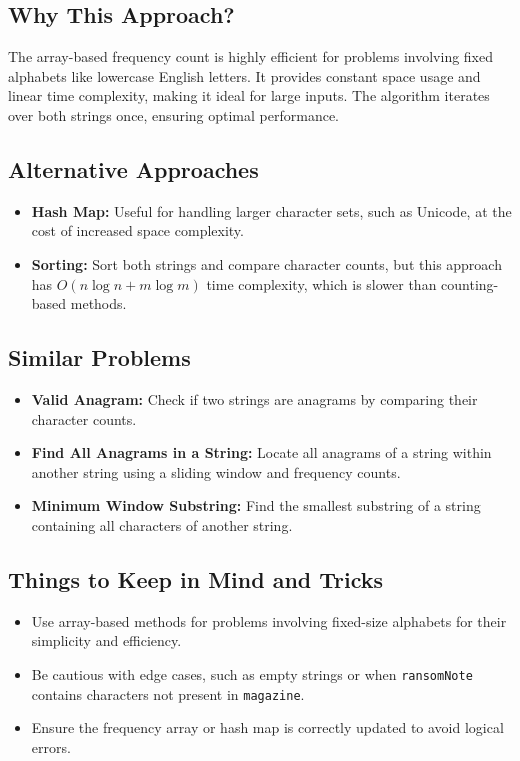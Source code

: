 \subsection*{Why This Approach?}
The array-based frequency count is highly efficient for problems involving fixed alphabets like lowercase English letters. It provides constant space usage and linear time complexity, making it ideal for large inputs. The algorithm iterates over both strings once, ensuring optimal performance.

\subsection*{Alternative Approaches}
\begin{itemize}
    \item \textbf{Hash Map:} Useful for handling larger character sets, such as Unicode, at the cost of increased space complexity.
    \item \textbf{Sorting:} Sort both strings and compare character counts, but this approach has \(O(n \log n + m \log m)\) time complexity, which is slower than counting-based methods.
\end{itemize}

\subsection*{Similar Problems}
\begin{itemize}
    \item \textbf{Valid Anagram:} Check if two strings are anagrams by comparing their character counts.
    \item \textbf{Find All Anagrams in a String:} Locate all anagrams of a string within another string using a sliding window and frequency counts.
    \item \textbf{Minimum Window Substring:} Find the smallest substring of a string containing all characters of another string.
\end{itemize}

\subsection*{Things to Keep in Mind and Tricks}
\begin{itemize}
    \item Use array-based methods for problems involving fixed-size alphabets for their simplicity and efficiency.
    \item Be cautious with edge cases, such as empty strings or when \texttt{ransomNote} contains characters not present in \texttt{magazine}.
    \item Ensure the frequency array or hash map is correctly updated to avoid logical errors.
\end{itemize}

